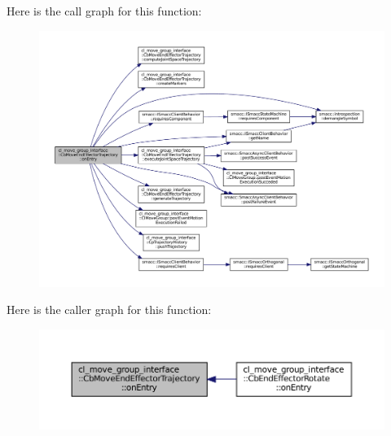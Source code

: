 Here is the call graph for this function\+:
\nopagebreak
\begin{figure}[H]
\begin{center}
\leavevmode
\includegraphics[width=350pt]{classcl__move__group__interface_1_1CbMoveEndEffectorTrajectory_aaedd074fd178c6390a4a3f1ccff23ad3_cgraph}
\end{center}
\end{figure}
Here is the caller graph for this function\+:
\nopagebreak
\begin{figure}[H]
\begin{center}
\leavevmode
\includegraphics[width=350pt]{classcl__move__group__interface_1_1CbMoveEndEffectorTrajectory_aaedd074fd178c6390a4a3f1ccff23ad3_icgraph}
\end{center}
\end{figure}
\mbox{\label{classcl__move__group__interface_1_1CbMoveEndEffectorTrajectory_a4952c092e69bc6e9831568de32888da5}} 
